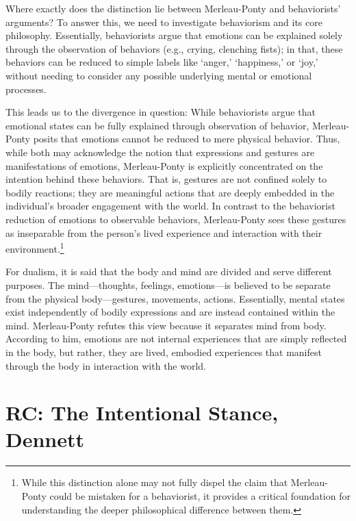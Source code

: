 \documentclass[11pt]{article}
\begin{document}
Where exactly does the distinction lie between Merleau-Ponty and behaviorists' arguments? To answer this, we need to investigate behaviorism and its core philosophy. Essentially, behaviorists argue that emotions can be explained solely through the observation of behaviors (e.g., crying, clenching fists); in that, these behaviors can be reduced to simple labels like `anger,' `happiness,' or `joy,' without needing to consider any possible underlying mental or emotional processes. 
	
This leads us to the divergence in question: While behaviorists argue that emotional states can be fully explained through observation of behavior, Merleau-Ponty posits that emotions cannot be reduced to mere physical behavior. Thus, while both may acknowledge the notion that expressions and gestures are manifestations of emotions, Merleau-Ponty is explicitly concentrated on the intention behind these behaviors. That is, gestures are not confined solely to bodily reactions; they are meaningful actions that are deeply embedded in the individual's broader engagement with the world. In contrast to the behaviorist reduction of emotions to observable behaviors, Merleau-Ponty sees these gestures as inseparable from the person's lived experience and interaction with their environment.\footnote{While this distinction alone may not fully dispel the claim that Merleau-Ponty could be mistaken for a behaviorist, it provides a critical foundation for understanding the deeper philosophical difference between them.}

For dualism, it is said that the body and mind are divided and serve different purposes. The mind—thoughts, feelings, emotions—is believed to be separate from the physical body—gestures, movements, actions. Essentially, mental states exist independently of bodily expressions and are instead contained within the mind. Merleau-Ponty refutes this view because it separates mind from body. According to him, emotions are not internal experiences that are simply reflected in the body, but rather, they are lived, embodied experiences that manifest through the body in interaction with the world.

\section{RC: The Intentional Stance, Dennett}
\end{document}
